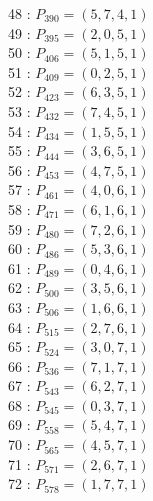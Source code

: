 \documentclass{article}
\begin{document}
{\begin{multicols}{3}
48 : $P_{390}=( 5, 7, 4, 1 )$\\
49 : $P_{395}=( 2, 0, 5, 1 )$\\
50 : $P_{406}=( 5, 1, 5, 1 )$\\
51 : $P_{409}=( 0, 2, 5, 1 )$\\
52 : $P_{423}=( 6, 3, 5, 1 )$\\
53 : $P_{432}=( 7, 4, 5, 1 )$\\
54 : $P_{434}=( 1, 5, 5, 1 )$\\
55 : $P_{444}=( 3, 6, 5, 1 )$\\
56 : $P_{453}=( 4, 7, 5, 1 )$\\
57 : $P_{461}=( 4, 0, 6, 1 )$\\
58 : $P_{471}=( 6, 1, 6, 1 )$\\
59 : $P_{480}=( 7, 2, 6, 1 )$\\
60 : $P_{486}=( 5, 3, 6, 1 )$\\
61 : $P_{489}=( 0, 4, 6, 1 )$\\
62 : $P_{500}=( 3, 5, 6, 1 )$\\
63 : $P_{506}=( 1, 6, 6, 1 )$\\
64 : $P_{515}=( 2, 7, 6, 1 )$\\
65 : $P_{524}=( 3, 0, 7, 1 )$\\
66 : $P_{536}=( 7, 1, 7, 1 )$\\
67 : $P_{543}=( 6, 2, 7, 1 )$\\
68 : $P_{545}=( 0, 3, 7, 1 )$\\
69 : $P_{558}=( 5, 4, 7, 1 )$\\
70 : $P_{565}=( 4, 5, 7, 1 )$\\
71 : $P_{571}=( 2, 6, 7, 1 )$\\
72 : $P_{578}=( 1, 7, 7, 1 )$\\
\end{multicols}


%


%


}%
\end{document}

